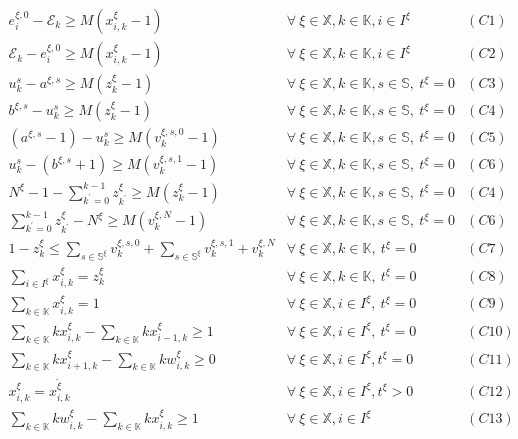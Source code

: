 \documentclass[]{interact}
\theoremstyle{plain}%
\theoremstyle{definition}
\theoremstyle{remark}
\begin{document}
\begin{eqnarray}
e^{\xi,0}_i-\mathcal{E}_{k} \ge M(x^{\xi}_{i,k}-1)& \forall\ \xi\in \mathbb{X},k\in \mathbb{K},i\in I^{\xi}&(C1)\nonumber\\
\mathcal{E}_{k} -e^{\xi,0}_i\ge M(x^{\xi}_{i,k}-1)&\forall\ \xi\in \mathbb{X},k\in \mathbb{K},i\in I^{\xi}&(C2)\nonumber\\
u^s_k - a^{\xi,s} \ge M(z^{\xi}_{k}-1)&\forall\ \xi\in \mathbb{X},k\in \mathbb{K},s\in \mathbb{S},\ t^{\xi} = 0&(C3)\nonumber\\
b^{\xi,s} - u^s_k \ge M(z^{\xi}_{k}-1)&\forall\ \xi\in \mathbb{X},k\in \mathbb{K},s\in \mathbb{S},\ t^{\xi} = 0&(C4)\nonumber\\
( a^{\xi,s}-1) - u^s_k \ge M(v^{\xi,s,0}_k-1) & \forall\ \xi\in \mathbb{X},k\in \mathbb{K},s\in \mathbb{S},\ t^{\xi} = 0 &(C5)\nonumber\\
u^s_k -  (b^{\xi,s}+1) \ge M(v^{\xi,s,1}_k-1) & \forall\ \xi\in \mathbb{X},k\in \mathbb{K},s\in \mathbb{S},\ t^{\xi} = 0 &(C6)\nonumber\\
N^{\xi} - 1 - \sum_{k^{'}=0}^{k-1} z^{\xi}_{k^{'}}\ge M(z^{\xi}_{k}-1)&\forall\ \xi\in \mathbb{X},k\in \mathbb{K},s\in \mathbb{S},\ t^{\xi} = 0&(C4)\nonumber\\
\sum_{k^{'}=0}^{k-1} z^{\xi}_{k^{'}} -  N^{\xi} \ge M(v^{\xi,N}_k-1) & \forall\ \xi\in \mathbb{X},k\in \mathbb{K},s\in \mathbb{S},\ t^{\xi} = 0 &(C6)\nonumber\\
1 - z^{\xi}_{k} \le \sum_{s\in \mathbb{S}^{\xi}} v^{\xi,s,0}_k + \sum_{s\in \mathbb{S}^{\xi}} v^{\xi,s,1}_k+v^{\xi,N}_k&\forall\ \xi\in \mathbb{X},k\in \mathbb{K},\ t^{\xi} = 0&(C7)\nonumber\\
\sum_{i\in I^{\xi}} x^{\xi}_{i,k} = z^{\xi}_k&\forall\ \xi\in \mathbb{X},k\in \mathbb{K},\ t^{\xi} = 0&(C8)\nonumber\\
\sum_{k\in \mathbb{K}} x^{\xi}_{i,k} =1& \forall\ \xi\in \mathbb{X},i\in I^{\xi},\ t^{\xi} = 0&(C9)\nonumber\\
\sum_{k\in \mathbb{K}} kx^{\xi}_{i,k} - \sum_{k\in \mathbb{K}} kx^{\xi}_{i-1,k} \ge 1&  \forall\ \xi\in \mathbb{X},i\in I^{\xi},\ t^{\xi} = 0&(C10)\nonumber\\
\sum_{k\in \mathbb{K}} kx^{\xi}_{i+1,k} - \sum_{k\in \mathbb{K}} kw^{\xi}_{i,k} \ge 0&  \forall\ \xi\in \mathbb{X},i\in I^{\xi}, t^{\xi} = 0&(C11)\nonumber\\
x^{\xi}_{i,k} = x^{\tilde{\xi}}_{i,k}&  \forall\ \xi\in \mathbb{X},i\in I^{\xi}, t^{\xi} > 0&(C12)\nonumber\\
\sum_{k\in \mathbb{K}} kw^{\xi}_{i,k} - \sum_{k\in \mathbb{K}} kx^{\xi}_{i,k} \ge 1 &\forall\ \xi\in \mathbb{X}, i\in I^{\xi}&(C13) \nonumber
\end{eqnarray}
\end{document}

